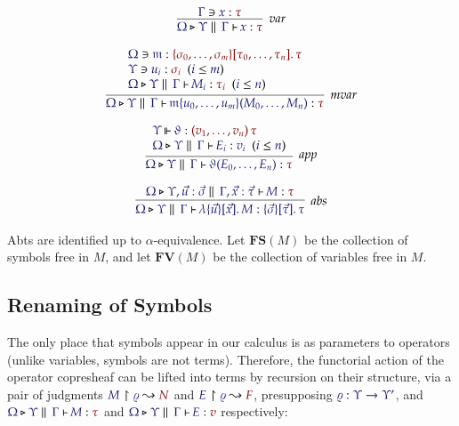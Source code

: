\documentclass[11pt]{article}
\theoremstyle{definition}
\theoremstyle{remark}
\numberwithin{equation}{section}
\def\IModeColorName{MidnightBlue}
\def\OModeColorName{Maroon}
\newcommand\IMode[1]{{\color{\IModeColorName}{#1}}}
\newcommand\OMode[1]{{\color{\OModeColorName}{#1}}}
\newcommand\HypJ[2]{#1\ \ (#2)}
\newcommand\Of[2]{\IMode{#1}: \IMode{#2}}
\newcommand\MkValence[3]{%
  \ifthenelse{\equal{#1}{}}{}{%
    \{#1\}%
  }%
  \ifthenelse{\equal{#2}{}}{}{%
    [#2]%
  }.\, #3%
}
\newcommand\MkBTm[3]{\mathbb{\lambda}\{#1\}[#2].\, #3}
\newcommand\MkArity[2]{(#1)\, #2}
\newcommand\Leq[2]{\IMode{#1}\leq\IMode{#2}}
\newcommand\IsOperator[3]{
  \IMode{#1}\,{\Vdash}\,\IMode{#2}: \OMode{#3}
}
\newcommand\Lookup[3]{\IMode{#1}\ni\IMode{#2}:\OMode{#3}}
\newcommand\IsAbt[5]{%
  \IMode{#1}\triangleright%
  \IMode{#2}\parallel%
  \,{\IMode{#3}\vdash}\,%
  \IMode{#4}:\OMode{#5}%
}
\newcommand\IsBTm[5]{%
  \IMode{#1}\triangleright%
  \IMode{#2}\parallel%
  \,{\IMode{#3}\vdash}\,%
  \IMode{#4}:\IMode{#5}%
}
\newcommand\MV[1]{\mathfrak{#1}}
\newcommand\MApp[3]{#1\{#2\}(#3)}
\newcommand\App[2]{#1(#2)}
\newcommand\FV[1]{\mathbf{FV}\left(#1\right)}
\newcommand\FS[1]{\mathbf{FS}\left(#1\right)}
\newcommand\Rename[2]{%
  #2\upharpoonright#1%
}
\newcommand\IsRenaming[3]{%
  \Rename{\IMode{#1}}{\IMode{#2}}%
  \leadsto\OMode{#3}%
}
\begin{document}
\begin{gather*}
  \infer[\textit{var}]{
    \IsAbt{\Omega}{\Upsilon}{\Gamma}{x}{\tau}
  }{
    \Lookup{\Gamma}{x}{\tau}
  }\\[6pt]
  \infer[\textit{mvar}]{
    \IsAbt{\Omega}{\Upsilon}{\Gamma}{
      \MApp{\MV{m}}{u_0,\dots,u_m}{M_0,\dots,M_n}
    }{\tau}
  }{
    \begin{array}{l}
      \Lookup{\Omega}{\MV{m}}{\MkValence{\sigma_0,\dots,\sigma_m}{\tau_0,\dots,\tau_n}{\tau}}\\
      \HypJ{\Lookup{\Upsilon}{u_i}{\sigma_i}}{\Leq{i}{m}}\\
      \HypJ{
        \IsAbt{\Omega}{\Upsilon}{\Gamma}{M_i}{\tau_i}
      }{
        \Leq{i}{n}
      }
    \end{array}
  }\\[6pt]
  \infer[\textit{app}]{
    \IsAbt{\Omega}{\Upsilon}{\Gamma}{
      \App{\vartheta}{E_0,\dots,E_n}
    }{\tau}
  }{
    \begin{array}{l}
      \IsOperator{\Upsilon}{\vartheta}{
        \MkArity{v_1,\dots,v_n}{\tau}
      }\\
      \HypJ{
        \IsBTm{\Omega}{\Upsilon}{\Gamma}{E_i}{v_i}
      }{
        \Leq{i}{n}
      }
    \end{array}
  }\\[6pt]
  \infer[\textit{abs}]{
    \IsBTm{\Omega}{\Upsilon}{\Gamma}{
      \MkBTm{\vec{u}}{\vec{x}}{M}
    }{
      \MkValence{\vec{\sigma}}{\vec{\tau}}{\tau}
    }
  }{
    \IsAbt{\Omega}{\Upsilon, \vec{u}:\vec{\sigma}}{\Gamma,\vec{x}:{\vec{\tau}}}{
      M
    }{
      \tau
    }
  }
\end{gather*}

Abts are identified up to $\alpha$-equivalence. Let $\FS{M}$ be the collection
of symbols free in $M$, and let $\FV{M}$ be the collection of variables free in
$M$. %

\subsection{Renaming of Symbols}

The only place that symbols appear in our calculus is as parameters to
operators (unlike variables, symbols are not terms). Therefore, the functorial
action of the operator copresheaf can be lifted into terms by recursion on their
structure, via a pair of judgments $\IsRenaming{\varrho}{M}{N}$ and
$\IsRenaming{\varrho}{E}{F}$, presupposing
$\Of{\varrho}{\Upsilon\to\Upsilon'}$, and $\IsAbt{\Omega}{\Upsilon}{\Gamma}{M}{\tau}$
and $\IsAbt{\Omega}{\Upsilon}{\Gamma}{E}{v}$ respectively:
\end{document}
